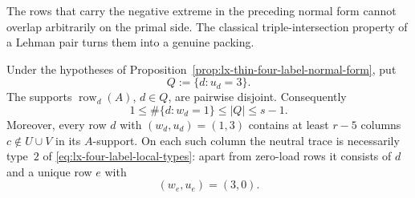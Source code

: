 The rows that carry the negative extreme in the preceding normal form cannot
overlap arbitrarily on the primal side.  The classical triple-intersection
property of a Lehman pair turns them into a genuine packing.

\begin{proposition}
\label{prop:lx-four-label-simple-row-star}
Under the hypotheses of
Proposition~\ref{prop:lx-thin-four-label-normal-form}, put
\[
 Q:=\{d:u_d=3\}.
\]
The supports $\operatorname{row}_d(A)$, $d\in Q$, are pairwise disjoint.
Consequently
\[
 1\leq \#\{d:w_d=1\}\leq |Q|\leq s-1.             \tag{LH-4g}
 \label{eq:lx-four-label-simple-row-packing}
\]
Moreover, every row $d$ with $(w_d,u_d)=(1,3)$ contains at least $r-5$
columns $c\notin U\cup V$ in its $A$-support.  On each such column the
neutral trace is necessarily type~$2$ of
\eqref{eq:lx-four-label-local-types}: apart from zero-load rows it consists
of $d$ and a unique row $e$ with
\[
 (w_e,u_e)=(3,0).                                   \tag{LH-4h}
 \label{eq:lx-four-label-simple-row-companion}
\]
\end{proposition}

